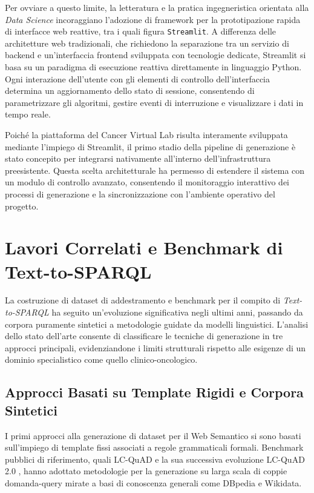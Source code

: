 \documentclass[12pt,a4paper,openright,twoside]{book}
\begin{document}
Per ovviare a questo limite, la letteratura e la pratica ingegneristica
orientata alla \textit{Data Science} incoraggiano l'adozione di framework per la
prototipazione rapida di interfacce web reattive, tra i quali figura
\texttt{Streamlit}. A differenza delle architetture web tradizionali, che
richiedono la separazione tra un servizio di backend e un'interfaccia frontend
sviluppata con tecnologie dedicate, Streamlit si basa su un paradigma di
esecuzione reattiva direttamente in linguaggio Python. Ogni interazione
dell'utente con gli elementi di controllo dell'interfaccia determina un
aggiornamento dello stato di sessione, consentendo di parametrizzare gli
algoritmi, gestire eventi di interruzione e visualizzare i dati in tempo reale.

Poiché la piattaforma del Cancer Virtual Lab risulta interamente sviluppata
mediante l'impiego di Streamlit, il primo stadio della pipeline di generazione è
stato concepito per integrarsi nativamente all'interno dell'infrastruttura
preesistente. Questa scelta architetturale ha permesso di estendere il sistema
con un modulo di controllo avanzato, consentendo il monitoraggio interattivo dei
processi di generazione e la sincronizzazione con l'ambiente operativo del
progetto.

\section{Lavori Correlati e Benchmark di Text-to-SPARQL}
\label{sec:bg-related-work}

La costruzione di dataset di addestramento e benchmark per il compito di
\textit{Text-to-SPARQL} ha seguito un'evoluzione significativa negli ultimi
anni, passando da corpora puramente sintetici a metodologie guidate da modelli
linguistici. L'analisi dello stato dell'arte consente di classificare le
tecniche di generazione in tre approcci principali, evidenziandone i limiti
strutturali rispetto alle esigenze di un dominio specialistico come quello
clinico-oncologico.

\subsection{Approcci Basati su Template Rigidi e Corpora Sintetici}
I primi approcci alla generazione di dataset per il Web Semantico si sono basati
sull'impiego di template fissi associati a regole grammaticali formali.
Benchmark pubblici di riferimento, quali LC-QuAD \cite{lcquad1} e la sua
successiva evoluzione LC-QuAD 2.0 \cite{lcquad2}, hanno adottato metodologie per
la generazione su larga scala di coppie domanda-query mirate a basi di
conoscenza generali come DBpedia e Wikidata.
\end{document}
